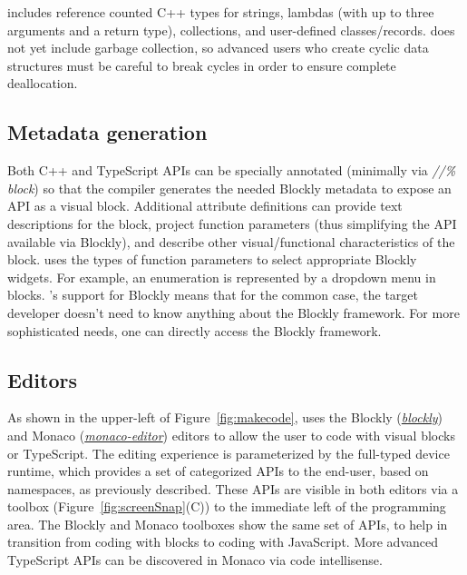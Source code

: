 {%

\MC includes reference counted C++ types for strings, lambdas (with
up to three arguments and a return type), collections, and user-defined classes/records.  
\MC does not yet include garbage collection, so advanced users who create cyclic
data structures must be careful to break cycles in order to ensure complete deallocation. 

\subsection{Metadata generation}

Both C++ and TypeScript APIs can be specially annotated (minimally via 
\emph{//\% block}) so that the \MC compiler generates the needed
Blockly metadata to expose an API as a visual block.
Additional attribute definitions can provide text descriptions for the block, project function
parameters (thus simplifying the API available via Blockly), and describe other visual/functional
characteristics of the block.  \MC uses the types of function parameters to select appropriate
Blockly widgets.  For example, an enumeration is represented by a dropdown menu in blocks.
\MCN's support for Blockly means that for the common case, the target developer doesn't need
to know anything about the Blockly framework.
For more sophisticated needs, one can directly access the Blockly framework. 

\subsection{Editors}

As shown in the upper-left of Figure~\ref{fig:makecode},
\MC uses the Blockly (\emph{\href{https://github.com/google/blockly}{blockly}}) and Monaco 
(\emph{\href{https://github.com/Microsoft/monaco-editor}{monaco-editor}}) editors to allow the user to code with
visual blocks or TypeScript. The editing experience is parameterized by the full-typed device
runtime, which provides a set of categorized APIs to the end-user, based on namespaces, as
previously described. These APIs are visible in both editors via a toolbox (Figure~\ref{fig:screenSnap}(C))
to the immediate
left of the programming area. The Blockly and Monaco toolboxes show the same set of APIs, to
help in transition from coding with blocks to coding with JavaScript. More advanced TypeScript
APIs can be discovered in Monaco via code intellisense.

}
